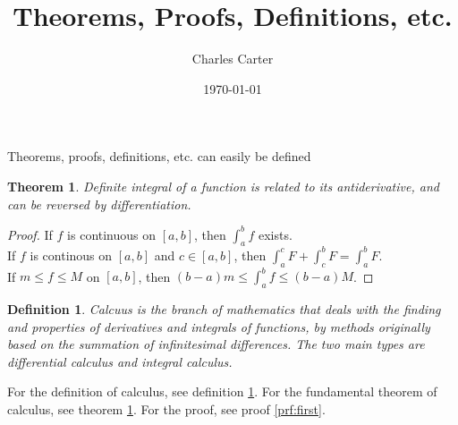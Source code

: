 \documentclass{article}
\title{Theorems, Proofs, Definitions, etc.}
\author{Charles Carter}
\date{\today{}}
\newtheorem{theorem}{Theorem}
\newtheorem{proof}{Proof}
\newtheorem{definition}{Definition}
\begin{document}
    Theorems, proofs, definitions, etc.  can easily be defined
    \begin{theorem}
        \label{thm:first}
        Definite integral of a function is related to its antiderivative, 
        and can be reversed by differentiation.
    \end{theorem}
    \begin{proof}
        \label{prf:first}
        If $f$ is continuous on $[a, b]$, 
            then $\int_a^b f$ exists. \\
        If $f$ is continous on $[a, b]$ and $c \in [a, b]$, 
            then $\int_a^c F + \int_c^b F = \int_a^b F$. \\
        If $m \leq f \leq M$ on $[a, b]$, 
            then $(b - a)m \leq \int_a^b f \leq (b - a)M$.
    \end{proof}
    \begin{definition}
        \label{def:first}
        Calcuus is the branch of mathematics that deals with the 
        finding and properties of derivatives and integrals of 
        functions, by methods originally based on the summation 
        of infinitesimal differences. The two main types are 
        differential calculus and integral calculus.
    \end{definition}
    For the definition of calculus, see definition \ref{def:first}. 
    For the fundamental theorem of calculus, see theorem \ref{thm:first}. 
    For the proof, see proof \ref{prf:first}.
    
\end{document}
